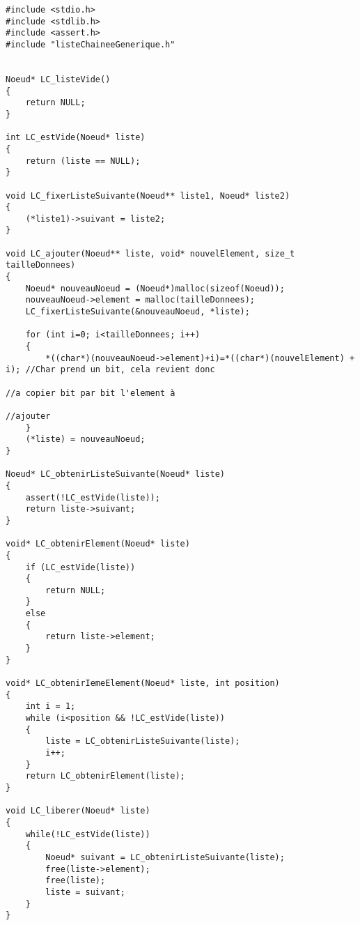  
\begin{lstlisting}
#include <stdio.h>
#include <stdlib.h>
#include <assert.h>
#include "listeChaineeGenerique.h"


Noeud* LC_listeVide()
{
	return NULL;
}

int LC_estVide(Noeud* liste)
{
	return (liste == NULL);
}

void LC_fixerListeSuivante(Noeud** liste1, Noeud* liste2)
{
	(*liste1)->suivant = liste2;
}

void LC_ajouter(Noeud** liste, void* nouvelElement, size_t tailleDonnees)
{
	Noeud* nouveauNoeud = (Noeud*)malloc(sizeof(Noeud));
	nouveauNoeud->element = malloc(tailleDonnees);
	LC_fixerListeSuivante(&nouveauNoeud, *liste);
	
	for (int i=0; i<tailleDonnees; i++)
	{
		*((char*)(nouveauNoeud->element)+i)=*((char*)(nouvelElement) + i); //Char prend un bit, cela revient donc
																	   //a copier bit par bit l'element à
																	   //ajouter
	}
	(*liste) = nouveauNoeud;
}

Noeud* LC_obtenirListeSuivante(Noeud* liste)
{
	assert(!LC_estVide(liste));
	return liste->suivant;
}

void* LC_obtenirElement(Noeud* liste)
{
	if (LC_estVide(liste))
	{
		return NULL;
	}
	else
	{
		return liste->element;
	}
}

void* LC_obtenirIemeElement(Noeud* liste, int position)
{
	int i = 1;
	while (i<position && !LC_estVide(liste))
	{
		liste = LC_obtenirListeSuivante(liste);
		i++;
	}
	return LC_obtenirElement(liste);
}

void LC_liberer(Noeud* liste)
{
	while(!LC_estVide(liste))
	{
		Noeud* suivant = LC_obtenirListeSuivante(liste);
		free(liste->element);
		free(liste);
		liste = suivant;
	}
}
\end{lstlisting}
 
